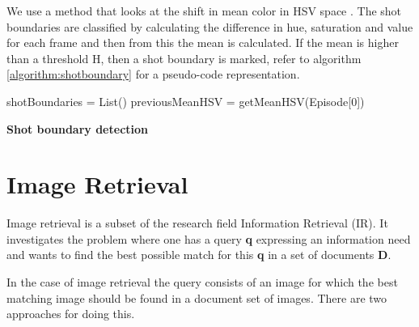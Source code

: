 \documentclass{report}
\begin{document}
We use a method that looks at the shift in mean color in HSV space \cite{shao2015shot}. The shot boundaries are classified by calculating the difference in hue, saturation and value for each frame and then from this the mean is calculated. If the mean is higher than a threshold H, then a shot boundary is marked, refer to algorithm \ref{algorithm:shotboundary} for a pseudo-code representation.

\begin{algorithm}[H] 
	\SetAlgoLined
	shotBoundaries = List()\;
	previousMeanHSV = getMeanHSV(Episode[0])\;
	\caption{\textbf{Shot boundary detection}}
	\label{algorithm:shotboundary}
\end{algorithm}

\chapter{Image Retrieval} \label{section:imageretrieval}
Image retrieval is a subset of the research field Information Retrieval (IR). It investigates the problem where one has a query \textbf{q} expressing an information need and wants to find the best possible match for this \textbf{q} in a set of documents \textbf{D}.

In the case of image retrieval the query consists of an image for which the best matching image should be found in a document set of images. There are two approaches for doing this.
\end{document}
